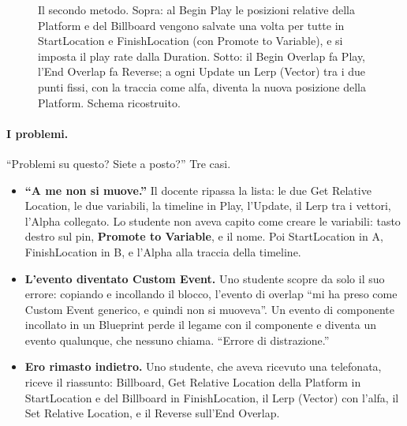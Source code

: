 \begin{figure}[htbp]
\caption{Il secondo metodo. Sopra: al Begin Play le posizioni relative della Platform e
del Billboard vengono salvate una volta per tutte in StartLocation e FinishLocation (con
Promote to Variable), e si imposta il play rate dalla Duration. Sotto: il Begin Overlap
fa Play, l'End Overlap fa Reverse; a ogni Update un Lerp (Vector) tra i due punti fissi,
con la traccia come alfa, diventa la nuova posizione della Platform. Schema
ricostruito.}
\label{ue6:fig:metodo2}
\end{figure}

\paragraph{I problemi.} ``Problemi su questo? Siete a posto?'' Tre casi.
\begin{itemize}
  \item \textbf{``A me non si muove.''} Il docente ripassa la lista: le due Get Relative
        Location, le due variabili, la timeline in Play, l'Update, il Lerp tra i
        vettori, l'Alpha collegato. Lo studente non aveva capito come creare le
        variabili: tasto destro sul pin, \textbf{Promote to Variable}, e il nome. Poi
        StartLocation in A, FinishLocation in B, e l'Alpha alla traccia della timeline.
  \item \textbf{L'evento diventato Custom Event.} Uno studente scopre da solo il suo
        errore: copiando e incollando il blocco, l'evento di overlap ``mi ha preso come
        Custom Event generico, e quindi non si muoveva''. Un evento di componente
        incollato in un Blueprint perde il legame con il componente e diventa un evento
        qualunque, che nessuno chiama. ``Errore di distrazione.''
  \item \textbf{Ero rimasto indietro.} Uno studente, che aveva ricevuto una telefonata,
        riceve il riassunto: Billboard, Get Relative Location della Platform in
        StartLocation e del Billboard in FinishLocation, il Lerp (Vector) con l'alfa, il
        Set Relative Location, e il Reverse sull'End Overlap.
\end{itemize}

